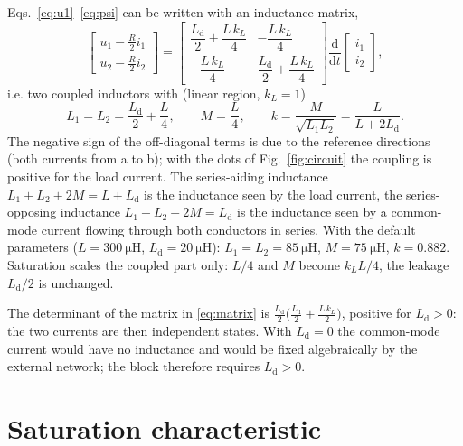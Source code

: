 \documentclass[11pt,a4paper]{article}
\begin{document}
Eqs.~\eqref{eq:u1}--\eqref{eq:psi} can be written with an inductance matrix,
\begin{equation}
  \begin{bmatrix} u_1 - \tfrac{R}{2} i_1 \\[1mm] u_2 - \tfrac{R}{2} i_2 \end{bmatrix}
  =
  \begin{bmatrix}
    \dfrac{L_\mathrm{d}}{2} + \dfrac{L\,k_L}{4} & -\dfrac{L\,k_L}{4} \\[3mm]
    -\dfrac{L\,k_L}{4} & \dfrac{L_\mathrm{d}}{2} + \dfrac{L\,k_L}{4}
  \end{bmatrix}
  \frac{\mathrm{d}}{\mathrm{d}t}
  \begin{bmatrix} i_1 \\[1mm] i_2 \end{bmatrix},
  \label{eq:matrix}
\end{equation}
i.e. two coupled inductors with (linear region, $k_L = 1$)
\begin{equation}
  L_1 = L_2 = \frac{L_\mathrm{d}}{2} + \frac{L}{4}, \qquad
  M = \frac{L}{4}, \qquad
  k = \frac{M}{\sqrt{L_1 L_2}} = \frac{L}{L + 2L_\mathrm{d}} .
\end{equation}
The negative sign of the off-diagonal terms is due to the reference directions (both
currents from a to b); with the dots of Fig.~\ref{fig:circuit} the coupling is positive
for the load current. The series-aiding inductance $L_1 + L_2 + 2M = L + L_\mathrm{d}$
is the inductance seen by the load current, the series-opposing inductance
$L_1 + L_2 - 2M = L_\mathrm{d}$ is the inductance seen by a common-mode current flowing
through both conductors in series. With the default parameters
($L = \SI{300}{\micro\henry}$, $L_\mathrm{d} = \SI{20}{\micro\henry}$):
$L_1 = L_2 = \SI{85}{\micro\henry}$, $M = \SI{75}{\micro\henry}$, $k = 0.882$.
Saturation scales the coupled part only: $L/4$ and $M$ become $k_L L/4$, the leakage
$L_\mathrm{d}/2$ is unchanged.

The determinant of the matrix in \eqref{eq:matrix} is
$\tfrac{L_\mathrm{d}}{2}\bigl(\tfrac{L_\mathrm{d}}{2} + \tfrac{L\,k_L}{2}\bigr)$, positive
for $L_\mathrm{d} > 0$: the two currents are then independent states. With
$L_\mathrm{d} = 0$ the common-mode current would have no inductance and would be fixed
algebraically by the external network; the block therefore requires $L_\mathrm{d} > 0$.

\section{Saturation characteristic}
\label{sec:sat}
\end{document}
